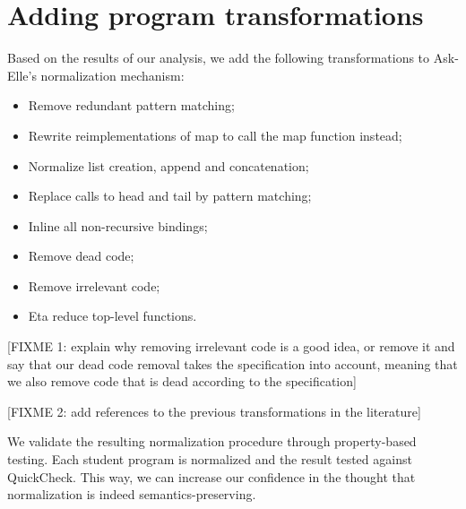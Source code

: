 

\section{Adding program transformations}

Based on the results of our analysis, we add the following transformations to Ask-Elle's normalization mechanism:

\begin{itemize}
    \item Remove redundant pattern matching;
    \item Rewrite reimplementations of map to call the map function instead;
    \item Normalize list creation, append and concatenation;
    \item Replace calls to head and tail by pattern matching;
    \item Inline all non-recursive bindings;
    \item Remove dead code;
    \item Remove irrelevant code;
    \item Eta reduce top-level functions.
\end{itemize}

[FIXME 1: explain why removing irrelevant code is a good idea, or remove it and say that our dead code removal takes the specification into account, meaning that we also remove code that is dead according to the specification]

[FIXME 2: add references to the previous transformations in the literature]

We validate the resulting normalization procedure through property-based testing. Each student program is normalized and the result tested against QuickCheck. This way, we can increase our confidence in the thought that normalization is indeed semantics-preserving.

